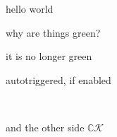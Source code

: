 \documentclass{article}
\begin{document}
hello world

why are things green?

it is no longer green

autotriggered, if enabled \(\)

\lipsum[1-5] \(\)

and the other side \(\mathbb{C}\mathcal{K}\)
\end{document}

